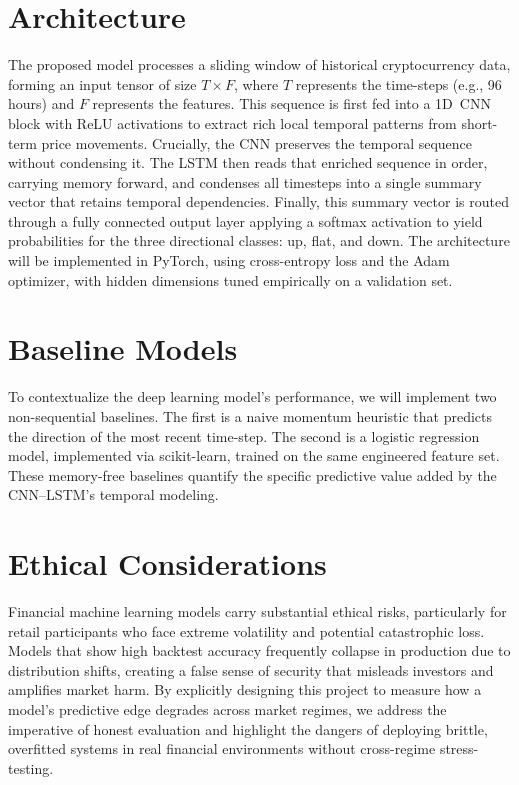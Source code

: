 \documentclass{article}
\begin{document}
\section{Architecture}
The proposed model processes a sliding window of historical cryptocurrency data, forming an input
tensor of size $T \times F$, where $T$ represents the time-steps (e.g., 96 hours) and $F$ represents
the features. This sequence is first fed into a 1D~CNN block with ReLU activations to extract rich
local temporal patterns from short-term price movements. Crucially, the CNN preserves the temporal
sequence without condensing it. The LSTM then reads that enriched sequence in order, carrying memory
forward, and condenses all timesteps into a single summary vector that retains temporal dependencies.
Finally, this summary vector is routed through a fully connected output layer applying a softmax
activation to yield probabilities for the three directional classes: up, flat, and down. The
architecture will be implemented in PyTorch, using cross-entropy loss and the Adam optimizer, with
hidden dimensions tuned empirically on a validation set.

\section{Baseline Models}
To contextualize the deep learning model's performance, we will implement two non-sequential baselines.
The first is a naive momentum heuristic that predicts the direction of the most recent time-step. The
second is a logistic regression model, implemented via scikit-learn, trained on the same engineered
feature set. These memory-free baselines quantify the specific predictive value added by the
CNN--LSTM's temporal modeling.

\section{Ethical Considerations}
Financial machine learning models carry substantial ethical risks, particularly for retail
participants who face extreme volatility and potential catastrophic loss. Models that show high
backtest accuracy frequently collapse in production due to distribution shifts, creating a false sense
of security that misleads investors and amplifies market harm. By explicitly designing this project to
measure how a model's predictive edge degrades across market regimes, we address the imperative of
honest evaluation and highlight the dangers of deploying brittle, overfitted systems in real financial
environments without cross-regime stress-testing.



\end{document}
